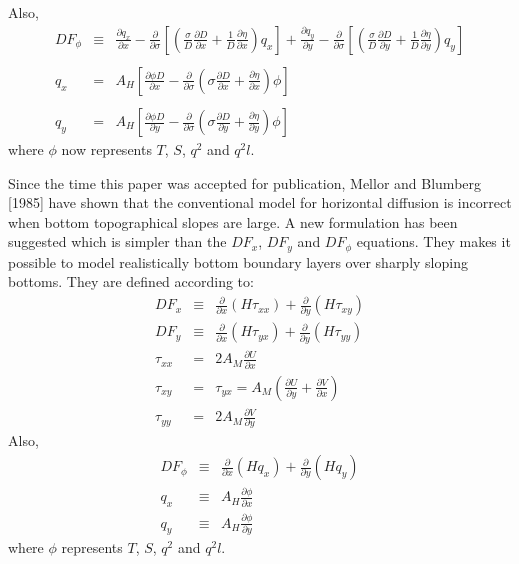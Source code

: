 \documentclass[oribibl]{llncs}
\begin{document}
Also,
\begin{eqnarray}
DF_\phi &\equiv& \frac{\partial q_{x}}{\partial x} -\frac{\partial}{\partial \sigma} \left[ \left(  \frac{\sigma}{D} \frac{\partial D}{\partial x} + \frac{1}{D} \frac{\partial \eta}{\partial x} \right) q_{x}  \right] +  \frac{\partial q_{y}}{\partial y} -\frac{\partial}{\partial \sigma} \left[ \left(  \frac{\sigma}{D} \frac{\partial D}{\partial y} + \frac{1}{D} \frac{\partial \eta}{\partial y} \right) q_{y}  \right]   \\ 
\nonumber \\ 
q_x &=&  A_H \left[ \frac{\partial \phi D}{\partial x} - \frac{\partial}{\partial \sigma} \left( \sigma \frac{\partial D}{\partial x} + \frac{\partial \eta}{\partial x}  \right) \phi \right]   \\ 
\nonumber \\ 
q_y &=&  A_H \left[ \frac{\partial \phi D}{\partial y} - \frac{\partial}{\partial \sigma} \left( \sigma \frac{\partial D}{\partial y} + \frac{\partial \eta}{\partial y}  \right) \phi \right] 
\end{eqnarray}
where $\phi$ now represents $T$, $S$, $q^2$ and $q^2 l$.

Since the time this paper was accepted for publication, Mellor and Blumberg [1985] have shown that the conventional model for horizontal diffusion is incorrect when bottom topographical slopes are large. A new formulation has been suggested which is simpler than the $DF_x$, $DF_y$ and $DF_\phi$ equations. They makes it possible to model realistically bottom boundary layers over sharply sloping bottoms. They are defined according to:
\begin{eqnarray}
DF_x &\equiv& \frac{\partial}{\partial x} (H\tau_{xx}) + \frac{\partial}{\partial y} (H\tau_{xy}) \\
DF_y &\equiv& \frac{\partial}{\partial x} (H\tau_{yx}) + \frac{\partial}{\partial y} (H\tau_{yy}) \\
\tau_{xx} &=& 2A_M\frac{\partial U}{\partial x}  \\
\tau_{xy} &=& \tau_{yx} = A_M(\frac{\partial U}{\partial y}+\frac{\partial V}{\partial x})  \\
\tau_{yy} &=& 2A_M \frac{\partial V}{\partial y} 
\end{eqnarray}
Also,
\begin{eqnarray}
DF_\phi &\equiv& \frac{\partial}{\partial x}(Hq_x) + \frac{\partial}{\partial y}(Hq_y) \\
q_x &\equiv& A_H\frac{\partial \phi}{\partial x} \\
q_y &\equiv& A_H\frac{\partial \phi}{\partial y}
\end{eqnarray}
where $\phi$ represents $T$, $S$, $q^2$ and $q^2 l$. 
\end{document}
